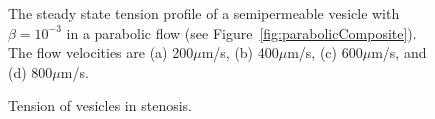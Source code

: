 \documentclass[9pt,twocolumn,twoside,lineno]{pnas-new}
\begin{document}
\begin{figure}[hbp]
  \centering
  \caption{\label{fig:parabolicTensions} The steady state tension
  profile of a semipermeable vesicle with $\beta=10^{-3}$ in a parabolic
  flow (see Figure~\ref{fig:parabolicComposite}). The flow velocities
  are (a) 200$\mu$m/s, (b) 400$\mu$m/s, (c) 600$\mu$m/s, and (d)
  800$\mu$m/s.}
\end{figure}

\begin{figure}[htp]
  \centering
  \caption{\label{fig:stenosisTensions} Tension of vesicles in
  stenosis.}
\end{figure}
\end{document}

